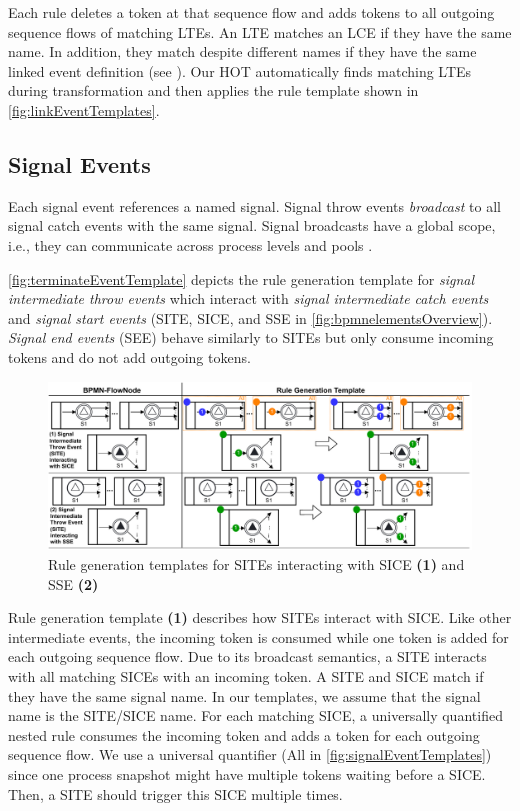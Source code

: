 \documentclass{lmcs} %
\begin{document}
Each rule deletes a token at that sequence flow and adds tokens to all outgoing sequence flows of matching LTEs.
An LTE matches an LCE if they have the same name.
In addition, they match despite different names if they have the same linked event definition (see \cite{objectmanagementgroupBusinessProcessModel2013}).
Our HOT automatically finds matching LTEs during transformation and then applies the rule template shown in \autoref{fig:linkEventTemplates}.

\subsection{Signal Events}
Each signal event references a named signal.
Signal throw events \textit{broadcast} to all signal catch events with the same signal.
Signal broadcasts have a global scope, i.e., they can communicate across process levels and pools \cite{objectmanagementgroupBusinessProcessModel2013}.

\autoref{fig:terminateEventTemplate} depicts the rule generation template for \textit{signal intermediate throw events} which interact with \textit{signal intermediate catch events} and \textit{signal start events} (\textsf{SITE}, \textsf{SICE}, and \textsf{SSE} in \autoref{fig:bpmnelementsOverview}).
\textit{Signal end events} (\textsf{SEE}) behave similarly to SITEs but only consume incoming tokens and do not add outgoing tokens.

\begin{figure}[ht]
    \centering
    \includegraphics[width=1\textwidth]{images/signal_rule_template.pdf}
    \caption{Rule generation templates for SITEs interacting with SICE \textbf{(1)} and SSE \textbf{(2)}}
    \label{fig:signalEventTemplates}
\end{figure}

Rule generation template \textbf{(1)} describes how SITEs interact with SICE.
Like other intermediate events, the incoming token is consumed while one token is added for each outgoing sequence flow.
Due to its broadcast semantics, a SITE interacts with all matching SICEs with an incoming token.
A SITE and SICE match if they have the same signal name.
In our templates, we assume that the signal name is the SITE/SICE name.
For each matching SICE, a universally quantified nested rule consumes the incoming token and adds a token for each outgoing sequence flow.
We use a universal quantifier (\textsf{All} in \autoref{fig:signalEventTemplates}) since one process snapshot might have multiple tokens waiting before a SICE.
Then, a SITE should trigger this SICE multiple times.
\end{document}
